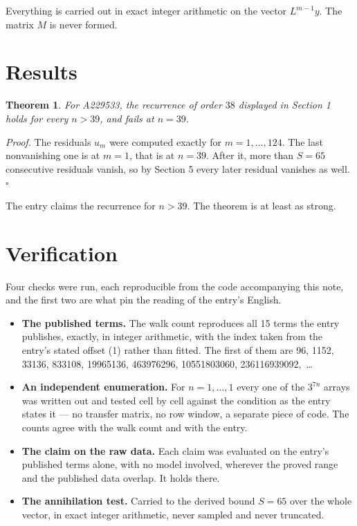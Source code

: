 \documentclass[11pt]{article}
\newtheorem{theorem}{Theorem}
\theoremstyle{definition}
\begin{document}
Everything is carried out in exact integer arithmetic on the vector $L^{m-1}y$. The matrix $M$ is never formed.

\section{Results}

\begin{theorem} For A229533, the recurrence of order $38$ displayed in Section 1 holds for every $n > 39$, and fails at $n = 39$.\end{theorem}

{\itshape Proof.} The residuals $u_m$ were computed exactly for $m = 1,\dots,124$. The last nonvanishing one is at $m = 1$, that is at $n = 39$. After it, more than $S = 65$ consecutive residuals vanish, so by Section 5 every later residual vanishes as well. $\square$

The entry claims the recurrence for $n > 39$. The theorem is at least as strong.

\section{Verification}

Four checks were run, each reproducible from the code accompanying this note, and the first two are what pin the reading of the entry's English.

\begin{itemize}

\item {\bfseries The published terms.} The walk count reproduces all 15 terms the entry publishes, exactly, in integer arithmetic, with the index taken from the entry's stated offset (1) rather than fitted. The first of them are 96, 1152, 33136, 833108, 19965136, 463976296, 10551803060, 236116939092,~\dots

\item {\bfseries An independent enumeration.} For $n = 1,\dots,1$ every one of the $3^{7n}$ arrays was written out and tested cell by cell against the condition as the entry states it --- no transfer matrix, no row window, a separate piece of code. The counts agree with the walk count and with the entry.

\item {\bfseries The claim on the raw data.} Each claim was evaluated on the entry's published terms alone, with no model involved, wherever the proved range and the published data overlap. It holds there.

\item {\bfseries The annihilation test.} Carried to the derived bound $S = 65$ over the whole vector, in exact integer arithmetic, never sampled and never truncated.

\end{itemize}
\end{document}
